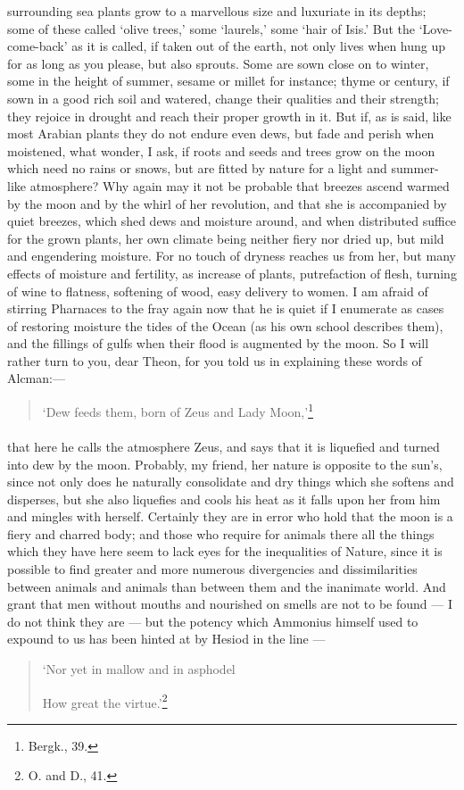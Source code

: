 \documentclass[a4paper, 11pt, oneside, polutonikogreek, english]{article}
\begin{document}
surrounding sea plants grow to a marvellous size and luxuriate in its depths; some of these called `olive trees,' some `laurels,' some `hair of Isis.' But the `Love-come-back' as it is called, if taken out of the earth, not only lives when hung up for as long as you please, but also sprouts. Some are sown close on to winter, some in the height of summer, sesame or millet for instance; thyme or century, if sown in a good rich soil and watered, change their qualities and their strength; they rejoice in drought and reach their proper growth in it. But if, as is said, like most Arabian plants they do not endure even dews, but fade and perish when moistened, what wonder, I ask, if roots and seeds and trees grow on the moon which need no rains or snows, but are fitted by nature for a light and summer-like atmosphere? Why again may it not be probable that breezes ascend warmed by the moon and by the whirl of her revolution, and that she is accompanied by quiet breezes, which shed dews and moisture around, and when distributed suffice for the grown plants, her own climate being neither fiery nor dried up, but mild and engendering moisture. For no touch of dryness reaches us from her, but many effects of moisture and fertility, as increase of plants, putrefaction of flesh, turning of wine to flatness, softening of wood, easy delivery to women. I am afraid of stirring Pharnaces to the fray again now that he is quiet if I enumerate as cases of restoring moisture the tides of the Ocean (as his own school describes them), and the fillings of gulfs when their flood is augmented by the moon. So I will rather turn to you, dear Theon, for you told us in explaining these words of Alcman:---
\begin{quotation}
`Dew feeds them, born of Zeus and Lady Moon,'\footnote{Bergk., 39.}
\end{quotation}
\paragraph{}
that here he calls the atmosphere Zeus, and says that it is liquefied and turned into dew by the moon. Probably, my friend, her nature is opposite to the sun's, since not only does he naturally consolidate and dry things which she softens and disperses, but she also liquefies and cools his heat as it falls upon her from him and mingles with herself. Certainly they are in error who hold that the moon is a fiery and charred body; and those who require for animals there all the things which they have here seem to lack eyes for the inequalities of Nature, since it is possible to find greater and more numerous divergencies and dissimilarities between animals and animals than between them and the inanimate world. And grant that men without mouths and nourished on smells are not to be found --- I do not think they are --- but the potency which Ammonius himself used to expound to us has been hinted at by Hesiod in the line ---
\begin{quotation}
`Nor yet in mallow and in asphodel

How great the virtue.'\footnote{ O. and D., 41.}
\end{quotation}
\end{document}
